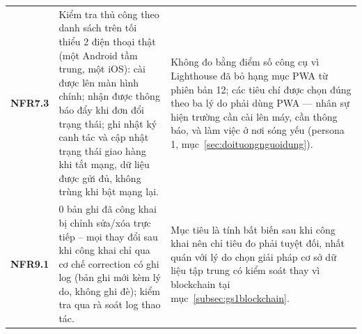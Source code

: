 \begin{longtable}{L{1.67cm} L{6.67cm} L{6.56cm}}
\textbf{NFR7.3} &
Kiểm tra thủ công theo danh sách trên tối thiểu 2 điện thoại thật (một Android tầm trung, một iOS): cài được lên màn hình chính; nhận được thông báo đẩy khi đơn đổi trạng thái; ghi nhật ký canh tác và cập nhật trạng thái giao hàng khi tắt mạng, dữ liệu được gửi đủ, không trùng khi bật mạng lại. &
Không đo bằng điểm số công cụ vì Lighthouse đã bỏ hạng mục PWA từ phiên bản 12; các tiêu chí được chọn đúng theo ba lý do phải dùng PWA --- nhân sự hiện trường cần cài lên máy, cần thông báo, và làm việc ở nơi sóng yếu (persona 1, mục~\ref{sec:doituongnguoidung}). \\
\textbf{NFR9.1} &
0 bản ghi đã công khai bị chỉnh sửa/xóa trực tiếp -- mọi thay đổi sau khi công khai chỉ qua cơ chế correction có ghi log (bản ghi mới kèm lý do, không ghi đè); kiểm tra qua rà soát log thao tác. &
Mục tiêu là tính bất biến sau khi công khai nên chỉ tiêu đo phải tuyệt đối, nhất quán với lý do chọn giải pháp cơ sở dữ liệu tập trung có kiểm soát thay vì blockchain tại mục~\ref{subsec:gs1blockchain}. \\
\end{longtable}
\endgroup

